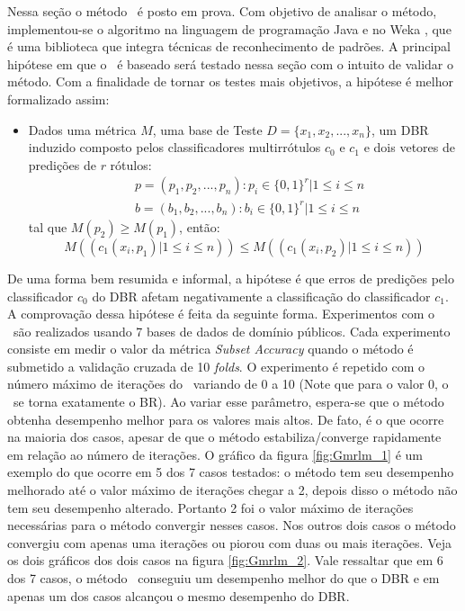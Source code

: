  Nessa seção o método \MRLMa~é posto em prova. Com objetivo de analisar o método, implementou-se o algoritmo
 na linguagem de programação Java e no Weka \cite{weka}, que é uma biblioteca que integra técnicas de reconhecimento de padrões.
 A principal hipótese em que o \MRLMa~é baseado será testado nessa seção com o intuito de validar o método.
 Com a finalidade de tornar os testes mais objetivos, a hipótese é melhor formalizado assim:
 \begin{itemize}

  \item Dados uma métrica $M$, uma base de Teste $D=\{x_1,x_2,...,x_n\}$,
  um DBR induzido composto pelos classificadores multirrótulos $c_0$ e $c_1$ e
  dois vetores de predições de $r$ rótulos:
  \begin{equation}
  \begin{split}
  & p=(p_1,p_2,...,p_n) : p_i \in {\{0,1\}}^r |1 \leq i \leq n \\
  & b=(b_1,b_2,...,b_n) : b_i \in {\{0,1\}}^r |1 \leq i \leq n
  \end{split}
  \end{equation}
  tal que $M(p_2) \geq M(p_1)$,
  então:
  \begin{equation}
  M((c_1(x_i,p_1) | 1 \leq i \leq n)) \leq M((c_1(x_i,p_2) | 1 \leq i \leq n))
  \end{equation}
 
 \end{itemize}

De uma forma bem resumida e informal, a hipótese é que erros de predições pelo
classificador $c_0$ do DBR afetam negativamente a classificação do classificador $c_1$.
A comprovação dessa hipótese é feita da seguinte forma. Experimentos com o \MRLMa~são realizados
usando 7 bases de dados de domínio públicos. Cada experimento consiste em medir o valor da métrica \textit{Subset Accuracy}
quando o método é submetido a validação cruzada de 10 \textit{folds}.
O experimento é repetido com o número máximo de iterações do
\MRLMa~variando de 0 a 10 (Note que para o valor 0, o \MRLMa~se torna exatamente o BR).
Ao variar esse parâmetro, espera-se que o método obtenha desempenho melhor para os valores mais altos.
De fato, é o que ocorre na maioria dos casos, apesar de que o método estabiliza/converge rapidamente em relação ao
número de iterações.
O gráfico da figura \ref{fig:Gmrlm_1} é um exemplo do que ocorre em 5 dos 7 casos testados: o método tem seu desempenho melhorado
até o valor máximo de iterações chegar a 2, depois disso o método não tem seu desempenho alterado.
Portanto 2 foi o valor máximo de iterações necessárias para o método convergir nesses casos.
Nos outros dois casos o método convergiu com apenas uma iterações ou piorou 
com duas ou mais iterações. Veja os dois gráficos dos dois casos na figura \ref{fig:Gmrlm_2}.
Vale ressaltar que em 6 dos 7 casos, o método \MRLMa~conseguiu um desempenho melhor do que o DBR e em apenas um dos casos
alcançou o mesmo desempenho do DBR.



